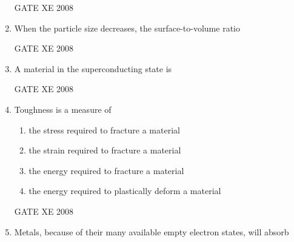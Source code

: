 \documentclass[12pt]{article}
\begin{document}
\begin{enumerate}
\begin{enumerate}
\end{enumerate}

    GATE XE 2008  
\item When the particle size decreases, the surface-to-volume ratio  

\begin{enumerate}
\end{enumerate}

    GATE XE 2008  
\item A material in the superconducting state is  

\begin{enumerate}
\end{enumerate}

    GATE XE 2008  
\item Toughness is a measure of  

\begin{enumerate}
\item  the stress required to fracture a material  
\item  the strain required to fracture a material 
\item  the energy required to fracture a material 
\item  the energy required to plastically deform a material 
\end{enumerate}

    GATE XE 2008  
\item Metals, because of their many available empty electron states, will absorb  


\end{enumerate}
\end{document}
